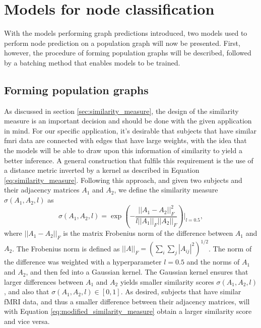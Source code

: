 \section{Models for node classification}

With the models performing graph predictions introduced, two models used to perform node prediction on a population graph will now be presented. First, however, the procedure of forming population graphs will be described, followed by a batching method that enables models to be trained.

\subsection{Forming population graphs}

As discussed in section \ref{sec:similarity_measure}, the design of the similarity measure is an important decision and should be done with the given application in mind. For our specific application, it's desirable that subjects that have similar \acrshort{fmri} data are connected with edges that have large weights, with the idea that the models will be able to draw upon this information of similarity to yield a better inference. A general construction that fulfils this requirement is the use of a distance metric inverted by a kernel as described in Equation \eqref{eq:similarity_measure}. Following this approach, and given two subjects and their adjacency matrices $A_1$ and $A_2$, we define the similarity measure $\sigma\left(A_1, A_2, l\right)$ as
\begin{equation}
    \sigma\left(A_1, A_2, l\right) = \exp{\left(- \frac{||A_1 - A_2||_F^2}{l||A_1||_F ||A_2||_F} \right)}\biggr\rvert_{l=0.5},
    \label{eq:modified_similarity_measure}
\end{equation}
where $||A_1 - A_2 ||_F$ is the matrix Frobenius norm of the difference between $A_1$ and $A_2$. The Frobenius norm is defined as $||A||_F = \left( \sum_i \sum_j |A_{ij}|^2 \right)^{1/2}$. The norm of the difference was weighted with a hyperparameter $l=0.5$ and the norms of $A_1$ and $A_2$, and then fed into a Gaussian kernel. The Gaussian kernel ensures that larger differences between $A_1$ and $A_2$ yields smaller similarity scores $\sigma\left(A_1, A_2, l\right)$, and also that  $\sigma\left(A_1, A_2, l\right) \in \left[0, 1\right]$. As desired, subjects that have similar fMRI data, and thus a smaller difference between their adjacency matrices, will with Equation \eqref{eq:modified_similarity_measure} obtain a larger similarity score and vice versa. 

